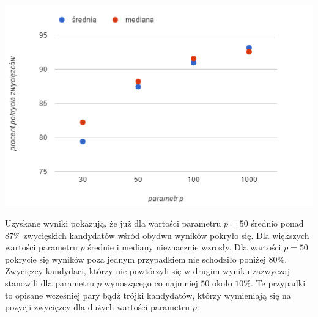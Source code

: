 \documentclass[pdflatex,11pt]{../aghdoc_version2}
\begin{document}
\vspace{\baselineskip}

\begin{center}
\centerline{\includegraphics[scale=1]{pics/srednia_mediana_od_parametr_p.png}}
\end{center}

Uzyskane wyniki pokazują, że już dla wartości parametru $p = 50$ średnio ponad $87 \%$ zwycięskich kandydatów wśród obydwu wyników pokryło się. Dla większych wartości parametru $p$ średnie i mediany nieznacznie wzrosły. Dla wartości $p = 50$ pokrycie się wyników poza jednym przypadkiem nie schodziło poniżej $80 \%$. Zwycięzcy kandydaci, którzy nie powtórzyli się w drugim wyniku zazwyczaj stanowili dla parametru $p$ wynoszącego co najmniej $50$ około $10 \%$. Te przypadki to opisane wcześniej pary bądź trójki kandydatów, którzy wymieniają się na pozycji zwycięzcy dla dużych wartości parametru $p$. 




\end{document}
